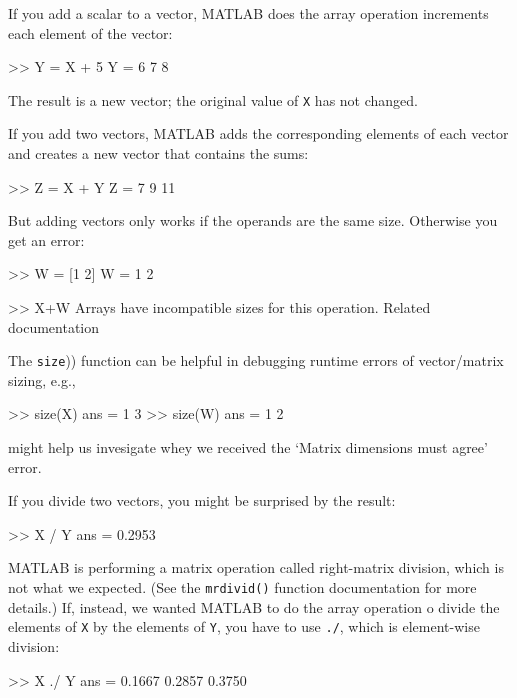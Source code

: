If you add a scalar to a vector, MATLAB does the array operation increments each element of the vector:

\begin{code}
>> Y = X + 5
Y = 6     7     8
\end{code}

The result is a new vector; the original value of \lstinline{X} has not
changed.

If you add two vectors, MATLAB adds the corresponding elements of each
vector and creates a new vector that contains the sums:

\begin{code}
>> Z = X + Y
Z = 7     9    11
\end{code}

But adding vectors only works if the operands are the same size.
Otherwise you get an error:

\begin{code}
>> W = [1 2]
W = 1     2

>> X+W
Arrays have incompatible sizes for this operation.
Related documentation 
\end{code}

The \lstinline(size()) function can be helpful in debugging runtime errors of vector/matrix sizing, e.g.,
\begin{code}
    >> size(X)
    ans =
         1     3
    >> size(W)
    ans =
         1     2
\end{code}
might help us invesigate whey we received the `Matrix dimensions must agree' error.


If you divide two vectors, you might be surprised by the result:

\begin{code}
>> X / Y
ans = 0.2953
\end{code}

MATLAB is performing a matrix operation called right-matrix division, which is not what we expected.  (See the \lstinline{mrdivid()} function documentation for more details.)
If, instead, we wanted MATLAB to do the array operation o divide the elements of \lstinline{X} by the elements of \lstinline{Y}, you have to use \lstinline{./}, which is element-wise division:

\begin{code}
>> X ./ Y
ans = 0.1667    0.2857    0.3750
\end{code}

